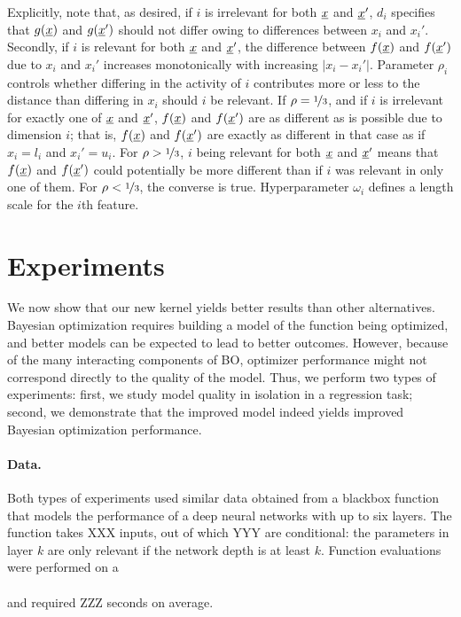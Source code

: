 \documentclass{article}
\newcommand{\vect}[1]{\underline{\smash{#1}}}
\renewcommand{\v}[1]{\vect{#1}}
\newcommand{\br}{}%
\newcommand{\note}[1]{}
\renewcommand{\note}[1]{~\\\frame{\begin{minipage}[c]{\textwidth}\vspace{2pt}\center{#1}\vspace{2pt}\end{minipage}}\vspace{3pt}\\}
\begin{document}
Explicitly, note that, as desired, if $i$ is irrelevant for both $\v{x}$ and $\v{x}'$, $d\br_i$ specifies that $g(\v{x})$ and $g(\v{x}')$ should not differ owing to differences between $x_i$ and $x_i'$. Secondly, if $i$ is relevant for both $\v{x}$ and $\v{x}'$, the difference between $f(\v{x})$ and $f(\v{x}')$ due to $x_i$ and $x_i'$ increases monotonically with increasing $\left|x_i-x_i'\right|$. Parameter $\rho_i$ controls whether differing in the activity of $i$ contributes more or less to the distance than differing in $x_i$ should $i$ be relevant. If $\rho = \nicefrac{1}{3}$, and if $i$ is irrelevant for exactly one of $\v{x}$ and $\v{x}'$, $f(\v{x})$ and $f(\v{x}')$ are as different as is possible due to dimension $i$; that is, $f(\v{x})$ and $f(\v{x}')$ are exactly as different in that case as if $x_i=l_i$ and $x_i'=u_i$. For $\rho>\nicefrac{1}{3}$, $i$ being relevant for both $\v{x}$ and $\v{x}'$ means that $f(\v{x})$ and $f(\v{x}')$ could potentially be more different than if
$i$ was relevant in only one of them. For $\rho<\nicefrac{1}{3}$, the converse is true. Hyperparameter $\omega_i$ defines a length scale for the $i$th feature. 







\section{Experiments}

We now show that our new kernel yields better results than other alternatives. 
Bayesian optimization requires building a model of the function being optimized, and better models can be expected to lead to better outcomes.  However, because of the many interacting components of BO, optimizer performance might not correspond directly to the quality of the model.  Thus, we perform two types of experiments: first, we study model quality in isolation in a regression task; second, we demonstrate that the improved model indeed yields improved Bayesian optimization performance.

\paragraph{Data.} Both types of experiments used similar data obtained from a blackbox function that models the performance of a deep neural networks with up to six layers. The function takes XXX inputs, out of which YYY are conditional: the parameters in layer $k$ are only relevant if the network depth is at least $k$.
Function evaluations were performed on a \note{type of GPU} and required ZZZ seconds on average.
\note{FH: please fill in XXX, YYY, and ZZZ.}
\end{document}
